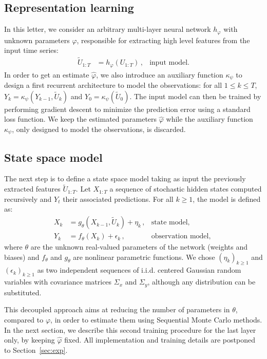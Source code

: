 \documentclass[journal]{IEEEtran}
\begin{document}
\subsection{Representation learning}%
In this letter, we consider an arbitrary multi-layer neural network $h_\varphi$ with unknown parameters $\varphi$, responsible for extracting high level features from the input time series:
\begin{align*}
	\widetilde U_{1:T} & = h_\varphi(U_{1:T})\,, & \text{input model.}
\end{align*}
In order to get an estimate $\hat \varphi$, we also introduce an auxiliary function $\kappa_\psi$ to design a first recurrent architecture to model the observations: for all $1 \leq k \leq T$, $Y_k = \kappa_\psi(Y_{k-1}, \widetilde U_k)$ and $Y_0 = \kappa_\psi(\widetilde U_0)$.
The input model can then be trained by performing gradient descent to minimize the prediction error using a standard loss function.
We keep the estimated parameters $\hat \varphi$ while the auxiliary function $\kappa_\psi$, only designed to model the observations, is discarded.

\subsection{State space model}
\label{sub:proposed_architecture}
The next step is to define  a state space model taking as input the previously extracted features $\widetilde U_{1:T}$.
Let $X_{1:T}$ a sequence of stochastic hidden states computed recursively and $Y_t$ their associated predictions.
For all $k \geq 1$, the model is defined as:
\begin{align*}
	X_k & = g_\theta(X_{k-1}, \widetilde U_k) + \eta_k\,, & \text{state model, }       \\
	Y_k & = f_\theta(X_k) + \epsilon_k\,,                 & \text{observation model, }
\end{align*}
where $\theta$ are the unknown real-valued parameters of the network (weights and biases) and $f_\theta$ and $g_\theta$ are nonlinear parametric functions.
We chose $(\eta_k)_{k\geq 1}$ and $(\epsilon_k)_{k\geq 1}$ as two independent sequences of i.i.d. centered Gaussian random variables with covariance matrices $\Sigma_x$ and $\Sigma_y$, although any distribution can be substituted.

This decoupled approach aims at reducing the number of parameters in $\theta$, compared to $\varphi$, in order to estimate them using Sequential Monte Carlo methods.
In the next section, we describe this second training procedure for the last layer only, by keeping $\hat \varphi$ fixed.
All implementation and training details are postponed to Section~\ref{sec:exp}.
\end{document}
